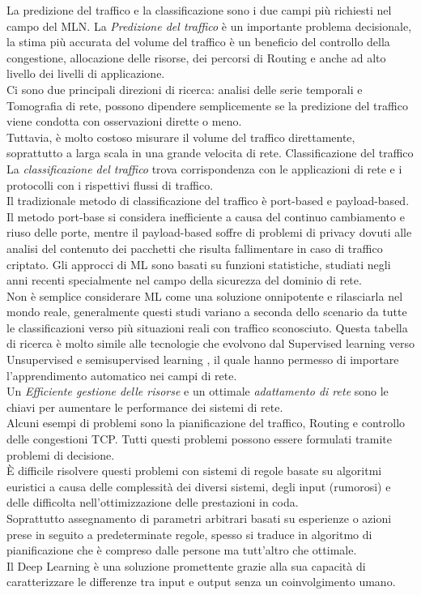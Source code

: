 \documentclass[../tesi.tex]{subfiles}
\begin{document}
La predizione del traffico e la classificazione sono i due campi più richiesti nel campo del MLN.
La \textit{Predizione del traffico} è un importante problema decisionale, la stima più accurata del volume del traffico è un beneficio del controllo della congestione, allocazione delle risorse, dei percorsi di Routing e anche ad alto livello dei livelli di applicazione.\\
Ci sono due principali direzioni di ricerca: analisi delle serie temporali e Tomografia di rete, possono dipendere semplicemente se la predizione del traffico viene condotta con osservazioni dirette o meno.\\
Tuttavia, è molto costoso misurare il volume del traffico direttamente, soprattutto a larga scala in una grande velocita di rete.
Classificazione del traffico 
La \textit{classificazione del traffico} trova corrispondenza con le applicazioni di rete e i protocolli con i rispettivi flussi di traffico.\\
Il tradizionale metodo di classificazione del traffico è \Gls{port-based} e \Gls{payload-based}. Il metodo port-base si considera inefficiente a causa del continuo cambiamento e riuso delle porte, mentre il payload-based soffre di problemi di privacy dovuti alle analisi del contenuto dei pacchetti che risulta fallimentare in caso di traffico criptato.
Gli approcci di ML sono basati su funzioni statistiche, studiati negli anni recenti specialmente nel campo della sicurezza del dominio di rete.\\
Non è semplice considerare ML come una soluzione onnipotente e rilasciarla nel mondo reale, generalmente questi studi variano a seconda dello scenario da tutte le classificazioni verso più situazioni reali con traffico sconosciuto. Questa tabella di ricerca è molto simile alle tecnologie che evolvono dal Supervised learning verso Unsupervised e semisupervised learning , il quale hanno permesso di importare l’apprendimento automatico nei campi di rete.\\

Un \textit{Efficiente gestione delle risorse} e un ottimale \textit{adattamento di rete} sono le chiavi per aumentare le performance dei sistemi di rete.\\ Alcuni esempi di problemi sono la pianificazione del traffico, Routing e controllo delle congestioni TCP. Tutti questi problemi possono essere formulati tramite problemi di decisione.\\
È difficile risolvere questi problemi con sistemi di regole basate su algoritmi euristici a causa delle complessità dei diversi sistemi, degli input (rumorosi) e delle difficolta nell’ottimizzazione delle prestazioni in coda.\\
Soprattutto assegnamento di parametri arbitrari basati su esperienze o azioni prese in seguito a predeterminate regole, spesso si traduce in algoritmo di pianificazione che è compreso dalle persone ma tutt’altro che ottimale.\\
Il \Gls{Deep Learning} è una soluzione promettente grazie alla sua capacità di caratterizzare le differenze tra input e output senza un coinvolgimento umano.
\end{document}
